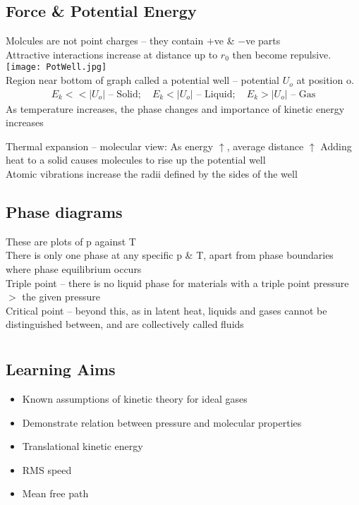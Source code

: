 \documentclass[a4paper, 11pt, fleqn, normalem]{report}
\begin{document}
\section{Force \& Potential Energy}
Molcules are not point charges -- they contain $+$ve \& $-$ve parts \\
Attractive interactions increase at distance up to $r_{0}$ then become repulsive. \\
\texttt{[image: PotWell.jpg]} \\
Region near bottom of graph called a potential well -- potential $U_{o}$ at position o.
\begin{align*}
	E_{k} << |U_{o}| \text{ -- Solid};\quad
	E_{k} < |U_{o}| \text{ -- Liquid};\quad
	E_{k} > |U_{o}| \text{ -- Gas}
\end{align*}
As temperature increases, the phase changes and importance of kinetic energy increases

Thermal expansion -- molecular view:
As energy $\uparrow$, average distance $\uparrow$
Adding heat to a solid causes molecules to rise up the potential well \\
Atomic vibrations increase the radii defined by the sides of the well

\section{Phase diagrams}
These are plots of p against T \\
There is only one phase at any specific p \& T, apart from phase boundaries where phase equilibrium occurs \\
Triple point -- there is no liquid phase for materials with a triple point pressure $>$ the given pressure \\
Critical point -- beyond this, as in latent heat, liquids and gases cannot be distinguished between, and are collectively called fluids

\chapter{}
\section{Learning Aims}
\begin{itemize}
	\item Known assumptions of kinetic theory for ideal gases
	\item Demonstrate relation between pressure and molecular properties
	\item Translational kinetic energy
	\item RMS speed
	\item Mean free path
\end{itemize}
\end{document}
